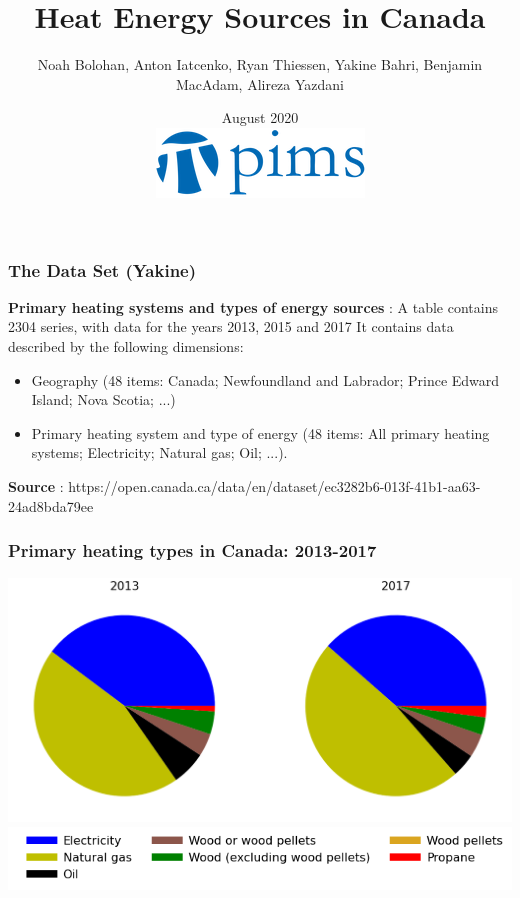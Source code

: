 \documentclass{beamer}
\title{Heat Energy Sources in Canada}
\author{Noah Bolohan, Anton Iatcenko, Ryan Thiessen, Yakine Bahri, Benjamin MacAdam, Alireza Yazdani}
\institute{Math\textsuperscript{Industry}}
\date{August 2020  \\ \vspace{30pt} \includegraphics[scale=0.3]{pims_logo.png} }
\begin{document}
\frame{\titlepage}

\begin{frame}
\frametitle{The Data Set (Yakine)}
\textbf{Primary heating systems and types of energy sources} : A table contains 2304 series, with data for the years 2013, 2015 and 2017
It contains data described by the following dimensions:
\begin{itemize}
\item Geography (48 items: Canada; Newfoundland and Labrador; Prince Edward Island; Nova Scotia; ...)
\item Primary heating system and type of energy (48 items: All primary heating systems; Electricity; Natural gas; Oil; ...).
\end{itemize}
\textbf{Source} : https://open.canada.ca/data/en/dataset/ec3282b6-013f-41b1-aa63-24ad8bda79ee
\end{frame}


\begin{frame}
\frametitle{Primary heating types in Canada: 2013-2017}
\includegraphics[width=\textwidth]{Canada20132017.png}\\
\includegraphics[width=\linewidth]{leg_bar.png}
\end{frame}
\end{document}
